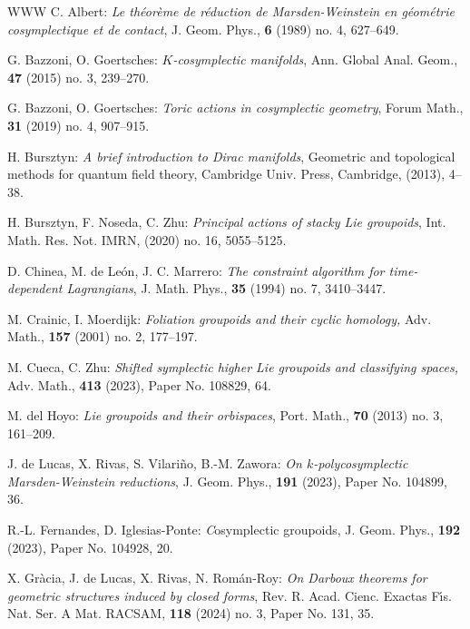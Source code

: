 \documentclass[
  a4paper, 
  reqno, 
  oneside, 
  12pt
]{amsart}
\theoremstyle{definition}
\theoremstyle{remark}
\begin{document}
\begin{thebibliography}{WWW}
 C. Albert: \emph{Le th\'{e}or\`eme de r\'{e}duction de {M}arsden-{W}einstein en g\'{e}om\'{e}trie cosymplectique et de contact}, J. Geom. Phys., {\bf 6} (1989) no. 4, 627--649.
	
 G. Bazzoni, O. Goertsches: \emph{{$K$}-cosymplectic manifolds}, Ann. Global Anal. Geom., {\bf 47}  (2015) no. 3, 239--270.

 G. Bazzoni, O. Goertsches: \emph{Toric actions 
in cosymplectic geometry}, Forum Math., {\bf 31}  (2019) no. 4, 907--915.

 H. Bursztyn: \emph{A brief introduction to {D}irac manifolds}, Geometric and topological methods for quantum field theory,  Cambridge Univ. Press, Cambridge, (2013), 4--38.

 H. Bursztyn, F. Noseda, C. Zhu: \emph{Principal actions of stacky {L}ie groupoids}, Int. Math. Res. Not. IMRN,  (2020) no. 16, 5055--5125.

 D. Chinea, M. de Le\'{o}n, J. C. Marrero: \emph{The constraint algorithm for time-dependent {L}agrangians}, J. Math. Phys., {\bf 35}  (1994) no. 7, 3410--3447.

 M. Crainic, I. Moerdijk: \emph{Foliation groupoids and their cyclic homology,} Adv. Math., {\bf 157} (2001) no. 2, 177--197.

 M. Cueca, C. Zhu: \emph{Shifted symplectic higher {L}ie groupoids and classifying spaces,} Adv. Math., {\bf 413} (2023), Paper No. 108829, 64.

 M. del Hoyo: \emph{Lie groupoids and their orbispaces}, Port. Math., {\bf 70} (2013) no. 3, 161--209.


 J. de Lucas, X. Rivas, S. Vilari\~{n}o, B.-M. Zawora: \emph{On {$k$}-polycosymplectic {M}arsden-{W}einstein reductions}, J. Geom. Phys., {\bf 191} (2023), Paper No. 104899, 36.
	
 R.-L. Fernandes, D. Iglesias-Ponte: {\emph Cosymplectic groupoids}, J. Geom. Phys., {\bf 192} (2023), Paper No. 104928, 20.

 X. Gr\`acia, J. de Lucas, X. Rivas, N.
Rom\'{a}n-Roy: \emph{On {D}arboux theorems for geometric structures induced by closed forms}, Rev. R. Acad. Cienc. Exactas F\'{\i}s. Nat. Ser. A Mat. RACSAM, {\bf 118} (2024) no. 3, Paper No. 131, 35.


\end{thebibliography}
\end{document}
